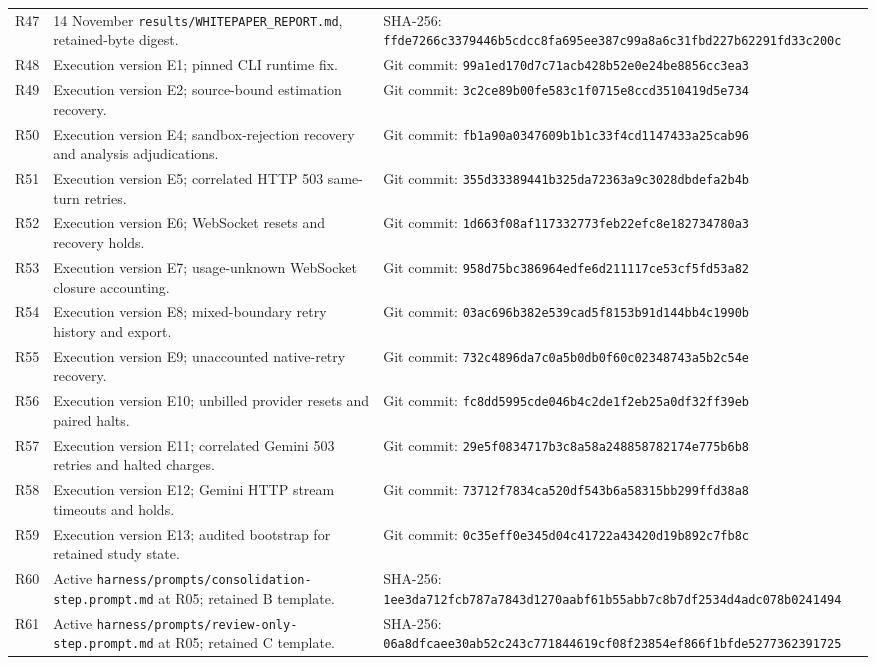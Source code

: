 \documentclass[11pt,a4paper]{article}
\begin{document}
\begin{longtable}{@{}L{0.7cm}L{6.2cm}L{8.1cm}@{}}
\label{prov:R47}R47 & 14 November \nolinkurl{results/WHITEPAPER_REPORT.md}, retained-byte digest. & SHA-256: \nolinkurl{ffde7266c3379446b5cdcc8fa695ee387c99a8a6c31fbd227b62291fd33c200c} \\
\label{prov:R48}R48 & Execution version E1; pinned CLI runtime fix. & Git commit: \nolinkurl{99a1ed170d7c71acb428b52e0e24be8856cc3ea3} \\
\label{prov:R49}R49 & Execution version E2; source-bound estimation recovery. & Git commit: \nolinkurl{3c2ce89b00fe583c1f0715e8ccd3510419d5e734} \\
\label{prov:R50}R50 & Execution version E4; sandbox-rejection recovery and analysis adjudications. & Git commit: \nolinkurl{fb1a90a0347609b1b1c33f4cd1147433a25cab96} \\
\label{prov:R51}R51 & Execution version E5; correlated HTTP 503 same-turn retries. & Git commit: \nolinkurl{355d33389441b325da72363a9c3028dbdefa2b4b} \\
\label{prov:R52}R52 & Execution version E6; WebSocket resets and recovery holds. & Git commit: \nolinkurl{1d663f08af117332773feb22efc8e182734780a3} \\
\label{prov:R53}R53 & Execution version E7; usage-unknown WebSocket closure accounting. & Git commit: \nolinkurl{958d75bc386964edfe6d211117ce53cf5fd53a82} \\
\label{prov:R54}R54 & Execution version E8; mixed-boundary retry history and export. & Git commit: \nolinkurl{03ac696b382e539cad5f8153b91d144bb4c1990b} \\
\label{prov:R55}R55 & Execution version E9; unaccounted native-retry recovery. & Git commit: \nolinkurl{732c4896da7c0a5b0db0f60c02348743a5b2c54e} \\
\label{prov:R56}R56 & Execution version E10; unbilled provider resets and paired halts. & Git commit: \nolinkurl{fc8dd5995cde046b4c2de1f2eb25a0df32ff39eb} \\
\label{prov:R57}R57 & Execution version E11; correlated Gemini 503 retries and halted charges. & Git commit: \nolinkurl{29e5f0834717b3c8a58a248858782174e775b6b8} \\
\label{prov:R58}R58 & Execution version E12; Gemini HTTP stream timeouts and holds. & Git commit: \nolinkurl{73712f7834ca520df543b6a58315bb299ffd38a8} \\
\label{prov:R59}R59 & Execution version E13; audited bootstrap for retained study state. & Git commit: \nolinkurl{0c35eff0e345d04c41722a43420d19b892c7fb8c} \\
\label{prov:R60}R60 & Active \nolinkurl{harness/prompts/consolidation-step.prompt.md} at R05; retained B template. & SHA-256: \nolinkurl{1ee3da712fcb787a7843d1270aabf61b55abb7c8b7df2534d4adc078b0241494} \\
\label{prov:R61}R61 & Active \nolinkurl{harness/prompts/review-only-step.prompt.md} at R05; retained C template. & SHA-256: \nolinkurl{06a8dfcaee30ab52c243c771844619cf08f23854ef866f1bfde5277362391725} \\
\end{longtable}
\endgroup
\end{document}
